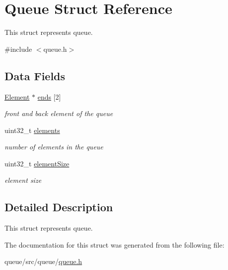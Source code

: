 \hypertarget{structQueue}{}\section{Queue Struct Reference}
\label{structQueue}


This struct represents queue.  




{\ttfamily \#include $<$queue.\+h$>$}

\subsection*{Data Fields}
\begin{DoxyCompactItemize}
\item 
\mbox{\label{structQueue_a2390d4106e5ee17bfd55f183b1f52ce5}} 
\hyperlink{queue_2src_2queue_2fwd_8h_a4d9e4171e0ee83fe777219f894992340}{Element} $\ast$ \hyperlink{structQueue_a2390d4106e5ee17bfd55f183b1f52ce5}{ends} \mbox{[}2\mbox{]}
\begin{DoxyCompactList}\small\item\em front and back element of the queue \end{DoxyCompactList}\item 
\mbox{\label{structQueue_a9a89d34ab1701342661b8685edafcb66}} 
uint32\+\_\+t \hyperlink{structQueue_a9a89d34ab1701342661b8685edafcb66}{elements}
\begin{DoxyCompactList}\small\item\em number of elements in the queue \end{DoxyCompactList}\item 
\mbox{\label{structQueue_a539bc88fdd8c83df642eddde4700fec1}} 
uint32\+\_\+t \hyperlink{structQueue_a539bc88fdd8c83df642eddde4700fec1}{element\+Size}
\begin{DoxyCompactList}\small\item\em element size \end{DoxyCompactList}\end{DoxyCompactItemize}


\subsection{Detailed Description}
This struct represents queue. 

The documentation for this struct was generated from the following file\+:\begin{DoxyCompactItemize}
\item 
queue/src/queue/\hyperlink{queue_8h}{queue.\+h}\end{DoxyCompactItemize}
